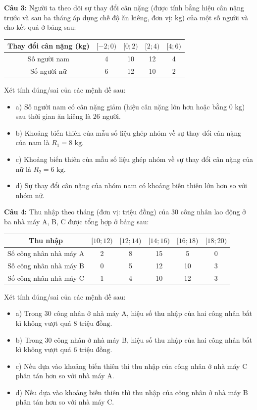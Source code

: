 \documentclass[12pt]{article}
\begin{document}
	\noindent \textbf{Câu 3:} Người ta theo dõi sự thay đổi cân nặng (được tính bằng hiệu cân nặng trước và sau ba tháng áp dụng chế độ ăn kiêng, đơn vị: kg) của một số người và cho kết quả ở bảng sau:
	\begin{center}
		\renewcommand{\arraystretch}{1.3}
		\begin{tabular}{|c|c|c|c|c|}
			\hline
			Thay đổi cân nặng (kg) & $[-2; 0)$ & $[0; 2)$ & $[2; 4)$ & $[4; 6)$ \\
			\hline
			Số người nam & 4 & 10 & 12 & 4 \\
			\hline
			Số người nữ & 6 & 12 & 10 & 2 \\
			\hline
		\end{tabular}
	\end{center}
	Xét tính đúng/sai của các mệnh đề sau:
	\begin{itemize}[label=, leftmargin=*]
		\item  a) Số người nam có cân nặng giảm (hiệu cân nặng lớn hơn hoặc bằng $0\text{ kg}$) sau thời gian ăn kiêng là 26 người.
		\item  b) Khoảng biến thiên của mẫu số liệu ghép nhóm về sự thay đổi cân nặng của nam là $R_1 = 8\text{ kg}$.
		\item  c) Khoảng biến thiên của mẫu số liệu ghép nhóm về sự thay đổi cân nặng của nữ là $R_2 = 6\text{ kg}$.
		\item  d) Sự thay đổi cân nặng của nhóm nam có khoảng biến thiên lớn hơn so với nhóm nữ.
	\end{itemize}
	
	\vspace{4mm}
	
	\noindent \textbf{Câu 4:} Thu nhập theo tháng (đơn vị: triệu đồng) của 30 công nhân lao động ở ba nhà máy A, B, C được tổng hợp ở bảng sau:
	\begin{center}
		\renewcommand{\arraystretch}{1.3}
		\begin{tabular}{|c|c|c|c|c|c|}
			\hline
			Thu nhập & $[10; 12)$ & $[12; 14)$ & $[14; 16)$ & $[16; 18)$ & $[18; 20)$ \\
			\hline
			Số công nhân nhà máy A & 2 & 8 & 15 & 5 & 0 \\
			\hline
			Số công nhân nhà máy B & 0 & 5 & 12 & 10 & 3 \\
			\hline
			Số công nhân nhà máy C & 1 & 4 & 10 & 12 & 3 \\
			\hline
		\end{tabular}
	\end{center}
	Xét tính đúng/sai của các mệnh đề sau:
	\begin{itemize}[label=, leftmargin=*]
		\item  a) Trong 30 công nhân ở nhà máy A, hiệu số thu nhập của hai công nhân bất kì không vượt quá $8\text{ triệu đồng}$.
		\item  b) Trong 30 công nhân ở nhà máy B, hiệu số thu nhập của hai công nhân bất kì không vượt quá $6\text{ triệu đồng}$.
		\item  c) Nếu dựa vào khoảng biến thiên thì thu nhập của công nhân ở nhà máy C phân tán hơn so với nhà máy A.
		\item  d) Nếu dựa vào khoảng biến thiên thì thu nhập của công nhân ở nhà máy B phân tán hơn so với nhà máy C.
	\end{itemize}
	
\end{document}
